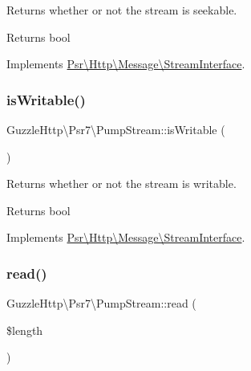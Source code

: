 Returns whether or not the stream is seekable.

\begin{DoxyReturn}{Returns}
bool 
\end{DoxyReturn}


Implements \hyperlink{interfacePsr_1_1Http_1_1Message_1_1StreamInterface_ad4a27548fd51bd12390d798981a1622b}{Psr\textbackslash{}\+Http\textbackslash{}\+Message\textbackslash{}\+Stream\+Interface}.

\mbox{\label{classGuzzleHttp_1_1Psr7_1_1PumpStream_ae14fa2b120954daabe0ed00b3492b180}} 
\subsubsection{\texorpdfstring{is\+Writable()}{isWritable()}}
{\footnotesize\ttfamily Guzzle\+Http\textbackslash{}\+Psr7\textbackslash{}\+Pump\+Stream\+::is\+Writable (\begin{DoxyParamCaption}{ }\end{DoxyParamCaption})}

Returns whether or not the stream is writable.

\begin{DoxyReturn}{Returns}
bool 
\end{DoxyReturn}


Implements \hyperlink{interfacePsr_1_1Http_1_1Message_1_1StreamInterface_a79287940d75d1951b831879fdc493883}{Psr\textbackslash{}\+Http\textbackslash{}\+Message\textbackslash{}\+Stream\+Interface}.

\mbox{\label{classGuzzleHttp_1_1Psr7_1_1PumpStream_acf2e568c0d25b1174fa070efb4def9db}} 
\subsubsection{\texorpdfstring{read()}{read()}}
{\footnotesize\ttfamily Guzzle\+Http\textbackslash{}\+Psr7\textbackslash{}\+Pump\+Stream\+::read (\begin{DoxyParamCaption}\item[{}]{\$length }\end{DoxyParamCaption})}

